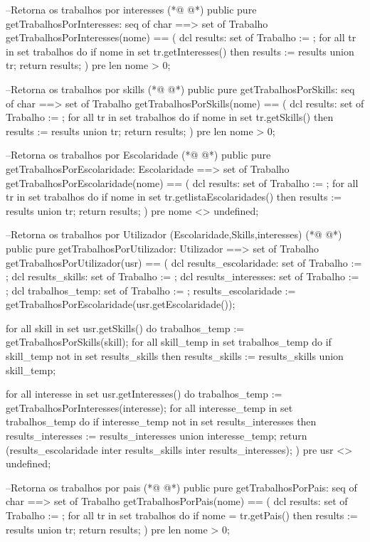 \begin{vdmpp}[breaklines=true]
 --Retorna os trabalhos por interesses
(*@
\label{getTrabalhosPorInteresses:70}
@*)
 public pure getTrabalhosPorInteresses: seq of char ==> set of Trabalho
 getTrabalhosPorInteresses(nome) == (
  dcl results: set of Trabalho := {};
  for all tr in set trabalhos do
   if nome in set tr.getInteresses() then
    results := results union {tr};
  return results;
 )
 pre len nome > 0;
 
 --Retorna os trabalhos por skills
(*@
\label{getTrabalhosPorSkills:81}
@*)
 public pure getTrabalhosPorSkills: seq of char ==> set of Trabalho
 getTrabalhosPorSkills(nome) == (
  dcl results: set of Trabalho := {};
  for all tr in set trabalhos do
   if nome in set tr.getSkills() then
    results := results union {tr};
  return results;
 )
 pre len nome > 0;

 --Retorna os trabalhos por Escolaridade
(*@
\label{getTrabalhosPorEscolaridade:92}
@*)
 public pure getTrabalhosPorEscolaridade: Escolaridade ==> set of Trabalho
 getTrabalhosPorEscolaridade(nome) == (
  dcl results: set of Trabalho := {};
  for all tr in set trabalhos do
   if nome in set tr.getlistaEscolaridades() then
    results := results union {tr};
  return results;
 )
 pre nome <> undefined;
 
 --Retorna os trabalhos por Utilizador (Escolaridade,Skills,interesses)
(*@
\label{getTrabalhosPorUtilizador:103}
@*)
 public pure getTrabalhosPorUtilizador: Utilizador ==> set of Trabalho
 getTrabalhosPorUtilizador(usr) == (
  dcl results_escolaridade: set of Trabalho := {};
  dcl results_skills: set of Trabalho := {};
  dcl results_interesses: set of Trabalho := {};
  dcl trabalhos_temp: set of Trabalho := {};
  results_escolaridade := getTrabalhosPorEscolaridade(usr.getEscolaridade());
  
  for all skill in set usr.getSkills() do
   trabalhos_temp := getTrabalhosPorSkills(skill);
   for all skill_temp in set trabalhos_temp do
    if skill_temp not in set results_skills then
     results_skills := results_skills union {skill_temp};
     
  for all interesse in set usr.getInteresses() do
   trabalhos_temp := getTrabalhosPorInteresses(interesse);
   for all interesse_temp in set trabalhos_temp do
    if interesse_temp not in set results_interesses then
     results_interesses := results_interesses union {interesse_temp};
  return (results_escolaridade inter results_skills inter results_interesses);
 )
 pre usr <> undefined;
 
 --Retorna os trabalhos por pais
(*@
\label{getTrabalhosPorPais:127}
@*)
 public pure getTrabalhosPorPais: seq of char ==> set of Trabalho
 getTrabalhosPorPais(nome) == (
  dcl results: set of Trabalho := {};
  for all tr in set trabalhos do
   if nome = tr.getPais() then
    results := results union {tr};
  return results;
 )
 pre len nome > 0;
 

\end{vdmpp}
